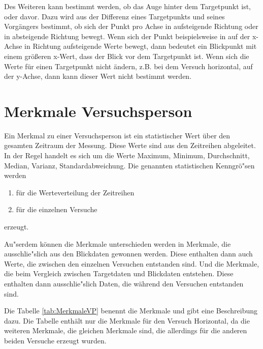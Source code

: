 Des Weiteren kann bestimmt werden, ob das Auge hinter dem Targetpunkt ist, oder davor. Dazu wird aus der Differenz eines Targetpunkts und seines Vorg\"angers bestimmt, ob sich der Punkt pro Achse in aufsteigende Richtung oder in absteigende Richtung bewegt. Wenn sich der Punkt beispielsweise in auf der x-Achse in Richtung aufsteigende Werte bewegt, dann bedeutet ein Blickpunkt mit einem gr\"o\ss{}eren x-Wert, dass der Blick vor dem Targetpunkt ist.
Wenn sich die Werte f\"ur einen Targetpunkt nicht \"andern, z.B. bei dem Versuch horizontal, auf der y-Achse, dann kann dieser Wert nicht bestimmt werden.

\section{Merkmale Versuchsperson}

Ein Merkmal zu einer Versuchsperson ist ein statistischer Wert \"uber den gesamten Zeitraum der Messung. Diese Werte sind aus den Zeitreihen abgeleitet. In der Regel handelt es sich um die Werte Maximum, Minimum, Durchschnitt, Median, Varianz, Standardabweichung.
Die genannten statistischen Kenngr\"o"sen werden
\begin{enumerate}
	\item f\"ur die Werteverteilung der Zeitreihen
	\item f\"ur die einzelnen Versuche
\end{enumerate}
erzeugt.

Au"serdem k\"onnen die Merkmale unterschieden werden in Merkmale, die ausschlie"slich aus den Blickdaten gewonnen werden. Diese enthalten dann auch Werte, die zwischen den einzelnen Versuchen entstanden sind. Und die Merkmale, die beim Vergleich zwischen Targetdaten und Blickdaten entstehen. Diese enthalten dann ausschlie"slich Daten, die w\"ahrend den Versuchen entstanden sind.

Die Tabelle \ref{tab:MerkmaleVP} benennt die Merkmale und gibt eine Beschreibung dazu. Die Tabelle enth\"alt nur die Merkmale f\"ur den Versuch Horizontal, da die weiteren Merkmale, die gleichen Merkmale sind, die allerdings f\"ur die anderen beiden Versuche erzeugt wurden.

